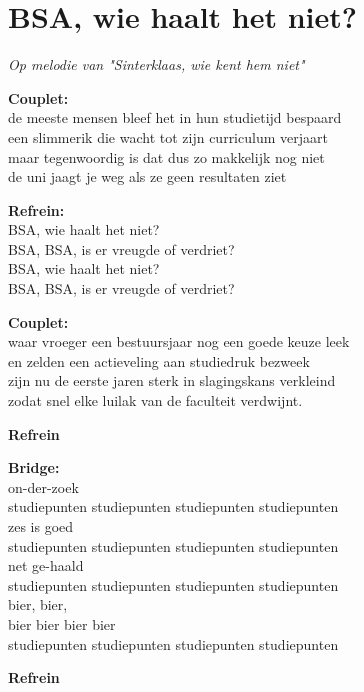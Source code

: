 \section{BSA, wie haalt het niet?}
\textit{Op melodie van "Sinterklaas, wie kent hem niet"}

\textbf{Couplet:}\\
de meeste mensen bleef het in hun studietijd bespaard\\
een slimmerik die wacht tot zijn curriculum verjaart\\
maar tegenwoordig is dat dus zo makkelijk nog niet\\
de uni jaagt je weg als ze geen resultaten ziet

\textbf{Refrein:}\\
BSA, wie haalt het niet?\\
BSA, BSA, is er vreugde of verdriet?\\
BSA, wie haalt het niet?\\
BSA, BSA, is er vreugde of verdriet?

\textbf{Couplet:}\\
waar vroeger een bestuursjaar nog een goede keuze leek\\
en zelden een actieveling aan studiedruk bezweek\\
zijn nu de eerste jaren sterk in slagingskans verkleind\\
zodat snel elke luilak van de faculteit verdwijnt.

\textbf{Refrein}

\textbf{Bridge:}\\
on-der-zoek\\
studiepunten studiepunten studiepunten studiepunten\\
zes is goed\\
studiepunten studiepunten studiepunten studiepunten\\
net ge-haald\\
studiepunten studiepunten studiepunten studiepunten\\
bier, bier,\\
bier bier bier bier\\
studiepunten studiepunten studiepunten studiepunten

\textbf{Refrein}
